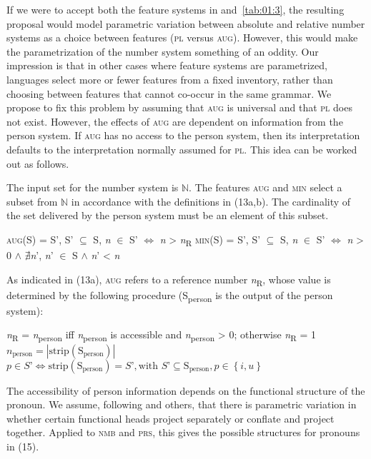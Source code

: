 \documentclass[output=paper]{langsci/langscibook}
\begin{document}
If we were to accept both the feature systems in  and~\ref{tab:01:3}, the resulting proposal would model parametric variation between absolute and relative number systems as a choice between features (\textsc{pl} versus \textsc{aug}). However, this would make the parametrization of the number system something of an oddity. Our impression is that in other cases where feature systems are parametrized, languages select more or fewer features from a fixed inventory, rather than choosing between features that cannot co-occur in the same grammar. We propose to fix this problem by assuming that \textsc{aug} is universal and that \textsc{pl} does not exist. However, the effects of \textsc{aug} are dependent on information from the person system. If \textsc{aug} has no access to the person system, then its interpretation defaults to the interpretation normally assumed for \textsc{pl}. This idea can be worked out as follows.

The input set for the number system is $\mathbb{N}$. The features \textsc{aug} and \textsc{min} select a subset from $\mathbb{N}$ in accordance with the definitions in (13a,b). The cardinality of the set delivered by the person system must be an element of this subset. 

\ea 
\ea \label{bkm:Ref234211253}   \textsc{aug}(S)  =  S’,  S’ ${\subseteq}$ S,  \textit{n} ${\in}$ S’ $\Leftrightarrow $ \textit{n} > \textit{n}\textsubscript{R}
\ex  \textsc{min}(S)  =  S’,  S’ ${\subseteq}$ S,  \textit{n} ${\in}$ S’ $\Leftrightarrow $ \textit{n} > 0 ${\wedge}$ ${\nexists}$\textit{n}’, \textit{n}’ ${\in}$ S ${\wedge}$ \textit{n}’ < \textit{n}
\z
\z

As indicated in (13a), \textsc{aug} refers to a reference number \textit{n}\textsubscript{R}, whose value is determined by the following procedure (S\textsubscript{person} is the output of the person system):

\ea \label{bkm:Ref453320625}
\ea \textit{n}\textsubscript{R} = \textit{n}\textsubscript{person} iff \textit{n}\textsubscript{person} is accessible and \textit{n}\textsubscript{person} > 0; otherwise \textit{n}\textsubscript{R} = 1
\ex $n_{\text{person}} = \left|\text{strip}\left(\text{S}_{\text{person}}\right)\right|$
\ex $p \in S’ \Leftrightarrow  \text{strip}\left(\text{S}_{\text{person}}\right)  =  S’, \text{with\ } S’ \subseteq \text{S}_{\text{person}},  p \in \left\{i, u\right\}$
\z
\z
{}

The accessibility of person information depends on the functional structure of the pronoun. We assume, following \citet{Platzack1983} and others, that there is parametric variation in whether certain functional heads project separately or conflate and project together. Applied to \textsc{nmb} and \textsc{prs}, this gives the possible structures for pronouns in (15).
\end{document}
